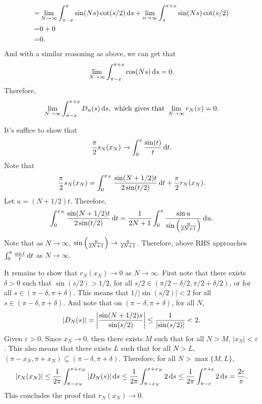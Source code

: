 \documentclass[12pt]{article}
\begin{document}
\begin{fproof}[4(a)]
\begin{align*}
   =&\lim_{N\to \infty} \int_{\pi-x}^{\pi} \sin(Ns) \cot(s/2) \mathop{}\!\mathrm{d} s + \lim_{n\to \infty} \int_{\pi}^{\pi+x} \sin(Ns) \cot(s/2) \\
   =& 0 +0\\
   =& 0.
 \end{align*}
 And with a similar reasoning as above, we can get that
 \begin{align*}
   \lim_{N \to \infty}\int_{\pi - x}^{\pi+x} \cos(Ns) \mathop{}\!\mathrm{d} s = 0.
 \end{align*}
 Therefore,
 \begin{align*}
   \lim_{N\to\infty} \int_{\pi - x}^{\pi+x} D_n(s) \mathop{}\!\mathrm{d} s, \text{ which gives that } \lim_{N \to \infty} r_N(x) = 0.
 \end{align*}
\end{fproof}

\begin{fproof}[4(b)]
 It's suffice to show that 
 \begin{align*}
   \frac{\pi}{2} s_N(x_N) \to \int_{0}^{x} \frac{\sin(t)}{t} \mathop{}\!\mathrm{d} t.
 \end{align*}
 Note that 
 \begin{align*}
   \frac{\pi}{2} s_N(x_N) = \int_{0}^{x_N} \frac{\sin(N+1/2)t}{2 \sin(t/2)} \mathop{}\!\mathrm{d} t + \frac{\pi}{2} r_N(x_N).
 \end{align*}
 Let \(u = (N + 1/2)t\).
 Therefore,
 \begin{align*}
   \int_{0}^{x_N} \frac{\sin(N+1/2)t}{2 \sin(t/2)} \mathop{}\!\mathrm{d} t = \frac{1}{2N + 1} \int_{0}^{\pi} \frac{\sin u}{\sin \left( \frac{u}{2N+1} \right)} \mathop{}\!\mathrm{d} u.
 \end{align*}
 Note that as \(N \to \infty\), \(\sin \left( \frac{u}{2N+1} \right) \to \frac{u}{2N+1}\).
 Therefore, above RHS approaches \(\int_{0}^{\pi} \frac{\sin t}{t} \mathop{}\!\mathrm{d} t\) as \(N \to \infty\).

 It remains to show that
 \(r_N(x_N) \to 0\) as \(N \to \infty\).
 First note that there exists \(\delta > 0\) such that \(\sin(s/2) > 1/2\), for all \(s/2 \in (\pi/2 - \delta/2, \pi/2 + \delta/2)\), or for all \(s \in (\pi - \delta, \pi + \delta)\).
 This means that \(1/|\sin(s/2)| < 2\) for all \(s \in (\pi - \delta, \pi + \delta)\).
 And note that on \((\pi - \delta, \pi + \delta)\), for all \(N\),
 \begin{align*}
   \left\lvert D_N(s) \right\rvert = \left\lvert \frac{\sin(N+1/2)s}{\sin(s/2)} \right\rvert \leq \frac{1}{\left\lvert \sin(s/2) \right\rvert} < 2.
 \end{align*}
 Given \(\varepsilon > 0\).
 Since \(x_N \to 0\), then there exists \(M\)
 such that for all \(N > M\), \(|x_N| < \varepsilon\). This also means that there exists \(L\) such that  for all \(N > L\), \((\pi-x_N, \pi + x_N) \subseteq (\pi - \delta, \pi + \delta)\).
 Therefore, for all \(N > \max\{M,L\}\),
 \begin{align*}
   \left\lvert r_N(x_N) \right\rvert 
   \leq \frac{1}{2\pi}\int_{\pi-x_N}^{\pi + x_N}\left\lvert D_N(s) \right\rvert \mathop{}\!\mathrm{d} s 
   \leq \frac{1}{2\pi}\int_{\pi-x_N}^{\pi + x_N} 2 \mathop{}\!\mathrm{d} s 
   \leq \frac{1}{2\pi} \int_{\pi - \varepsilon}^{\pi + \varepsilon} 2 \mathop{}\!\mathrm{d} s 
   = \frac{2 \varepsilon}{\pi}.
 \end{align*}
 This concludes the proof that \(r_N(x_N) \to 0\).
\end{fproof}
\end{document}
